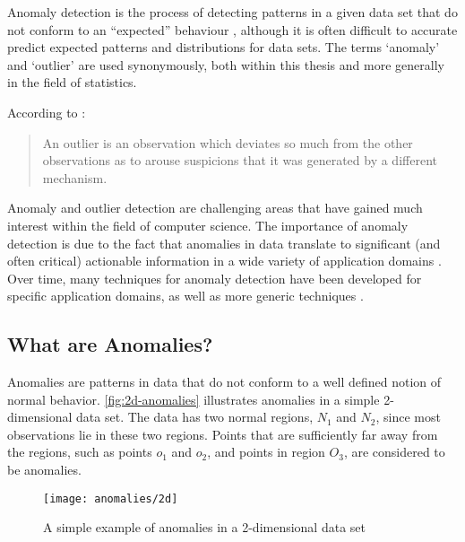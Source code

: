 Anomaly detection is the process of detecting patterns in a given data set that
do not conform to an ``expected'' behaviour \cite{Chandola:2007}, although it is
often difficult to accurate predict expected patterns and distributions for data
sets. The terms `anomaly' and `outlier' are used synonymously, both within this
thesis and more generally in the field of statistics.

According to \citeauthor{Hawkins:1980} \cite{Hawkins:1980}:
\begin{quote}
An outlier is an observation which deviates so much from the other observations
as to arouse suspicions that it was generated by a different mechanism.
\end{quote}

Anomaly and outlier detection are challenging areas that have gained much
interest within the field of computer science. The importance of anomaly
detection is due to the fact that anomalies in data translate to significant
(and often critical) actionable information in a wide variety of application
domains \cite{Chandola:2007}. Over time, many techniques for anomaly detection
have been developed for specific application domains, as well as more generic
techniques \cite{Chandola:2007}.

\subsection{What are Anomalies?}
\label{anomalyDetection:whatAre}
Anomalies are patterns in data that do not conform to a well defined notion of
normal behavior. \autoref{fig:2d-anomalies} illustrates anomalies in a simple
2-dimensional data set. The data has two normal regions, $N_1$ and $N_2$, since
most observations lie in these two regions. Points that are sufficiently far
away from the regions, such as points $o_1$ and $o_2$, and points in region
$O_3$, are considered to be anomalies.

\begin{figure}
    \centering
    \texttt{[image: anomalies/2d]}
    \caption[A simple example of anomalies in a 2-dimensional data set]{A
        simple example of anomalies in a 2-dimensional data set
        \cite{Chandola:2007}}
    \label{fig:2d-anomalies}
\end{figure}

